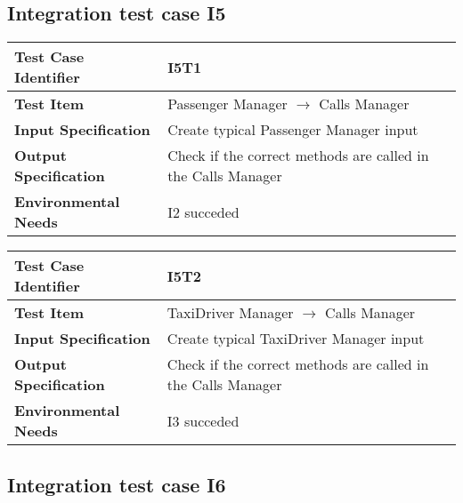 \subsection{Integration test case I5}

\begin{table}[!htbp]
\begin{center}
\begin{tabular}[t]{p{}|p{}}

\hline
\textbf{Test Case Identifier} & I5T1 \\
\hline
\textbf{Test Item} & Passenger Manager $\rightarrow$ Calls Manager \\
\hline
\textbf{Input Specification} & Create typical Passenger Manager input \\
\hline
\textbf{Output Specification} & Check if the correct methods are called in the Calls Manager \\
\hline
\textbf{Environmental Needs} & I2 succeded \\
\hline

\end{tabular}
\end{center}
\end{table}

\begin{table}[!htbp]
\begin{center}
\begin{tabular}[t]{p{}|p{}}

\hline
\textbf{Test Case Identifier} & I5T2 \\
\hline
\textbf{Test Item} & TaxiDriver Manager $\rightarrow$ Calls Manager \\
\hline
\textbf{Input Specification} & Create typical TaxiDriver Manager input \\
\hline
\textbf{Output Specification} & Check if the correct methods are called in the Calls Manager \\
\hline
\textbf{Environmental Needs} & I3 succeded \\
\hline

\end{tabular}
\end{center}
\end{table}

\subsection{Integration test case I6}

